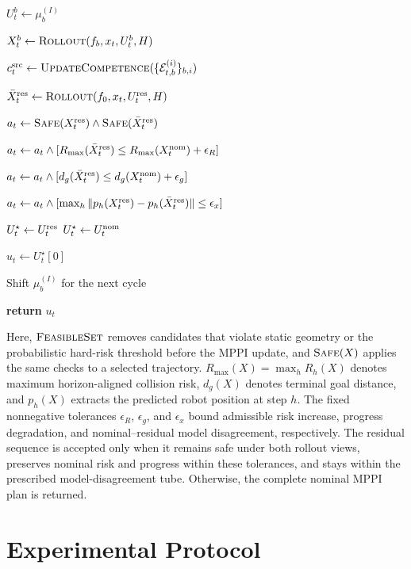 \documentclass[conference]{IEEEtran}
\begin{document}
\begin{algorithm}[!t]
\begin{algorithmic}[1]
    \ENDFOR

    \STATE $U_t^b\leftarrow\mu_b^{(I)}$

    \STATE $X_t^b\leftarrow
    \textsc{Rollout}(f_b,x_t,U_t^b,H)$

\ENDFOR

\STATE $c_t^{\rm src}\leftarrow
\textsc{UpdateCompetence}
(\{\mathcal{E}_{t,b}^{(i)}\}_{b,i})$

\STATE $\bar{X}_t^{\rm res}\leftarrow
\textsc{Rollout}(f_0,x_t,U_t^{\rm res},H)$

\STATE $a_t\leftarrow
\textsc{Safe}(X_t^{\rm res})
\wedge\textsc{Safe}(\bar{X}_t^{\rm res})$

\STATE $a_t\leftarrow a_t\wedge
[R_{\max}(\bar{X}_t^{\rm res})
\le R_{\max}(X_t^{\rm nom})+\epsilon_R]$

\STATE $a_t\leftarrow a_t\wedge
[d_g(\bar{X}_t^{\rm res})
\le d_g(X_t^{\rm nom})+\epsilon_g]$

\STATE $a_t\leftarrow a_t\wedge
[\max_h\|p_h(X_t^{\rm res})
-p_h(\bar{X}_t^{\rm res})\|\le\epsilon_x]$

    \STATE $U_t^\star\leftarrow U_t^{\rm res}$
\ELSE
    \STATE $U_t^\star\leftarrow U_t^{\rm nom}$
\ENDIF

\STATE $u_t\leftarrow U_t^\star[0]$

\STATE Shift $\mu_b^{(I)}$ for the next cycle

\STATE \textbf{return} $u_t$

\end{algorithmic}
\end{algorithm}

Here, $\textsc{FeasibleSet}$ removes candidates that violate static geometry
or the probabilistic hard-risk threshold before the MPPI update, and
$\textsc{Safe}(X)$ applies the same checks to a selected trajectory.
$R_{\max}(X)=\max_h R_h(X)$ denotes maximum horizon-aligned collision risk,
$d_g(X)$ denotes terminal goal distance, and $p_h(X)$ extracts the predicted
robot position at step $h$. The fixed nonnegative tolerances $\epsilon_R$,
$\epsilon_g$, and $\epsilon_x$ bound admissible risk increase, progress
degradation, and nominal--residual model disagreement, respectively. The
residual sequence is accepted only when it remains safe under both rollout
views, preserves nominal risk and progress within these tolerances, and stays
within the prescribed model-disagreement tube. Otherwise, the complete
nominal MPPI plan is returned.

\section{Experimental Protocol}
\label{sec:protocol}
\end{document}
